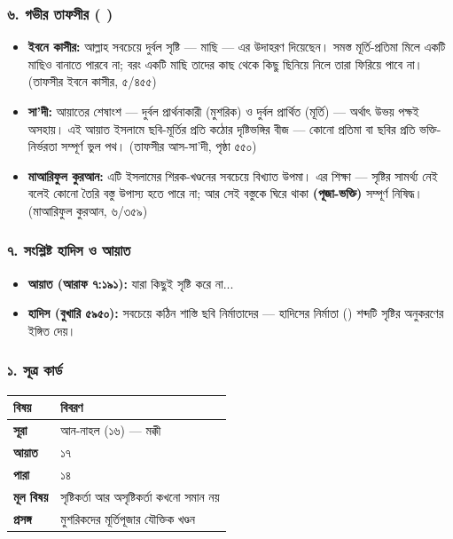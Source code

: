 \subsubsection*{৬. গভীর তাফসীর ( )}

\begin{itemize}
\item \textbf{ইবনে কাসীর:} আল্লাহ সবচেয়ে দুর্বল সৃষ্টি — মাছি — এর উদাহরণ দিয়েছেন। সমস্ত মূর্তি-প্রতিমা মিলে একটি মাছিও বানাতে পারবে না; বরং একটি মাছি তাদের কাছ থেকে কিছু ছিনিয়ে নিলে তারা ফিরিয়ে পাবে না। (তাফসীর ইবনে কাসীর, ৫/৪৫৫)
\item \textbf{সা'দী:} আয়াতের শেষাংশ — দুর্বল প্রার্থনাকারী (মুশরিক) ও দুর্বল প্রার্থিত (মূর্তি) — অর্থাৎ উভয় পক্ষই অসহায়। এই আয়াত ইসলামে ছবি-মূর্তির প্রতি কঠোর দৃষ্টিভঙ্গির বীজ — কোনো প্রতিমা বা ছবির প্রতি ভক্তি-নির্ভরতা সম্পূর্ণ ভুল পথ। (তাফসীর আস-সা'দী, পৃষ্ঠা ৫৫০)
\item \textbf{মাআরিফুল কুরআন:} এটি ইসলামের শিরক-খণ্ডনের সবচেয়ে বিখ্যাত উপমা। এর শিক্ষা — সৃষ্টির সামর্থ্য নেই বলেই কোনো তৈরি বস্তু উপাস্য হতে পারে না; আর সেই বস্তুকে ঘিরে থাকা \textbf{ (পূজা-ভক্তি)} সম্পূর্ণ নিষিদ্ধ। (মাআরিফুল কুরআন, ৬/৩৫৯)
\end{itemize}
\subsubsection*{৭. সংশ্লিষ্ট হাদিস ও আয়াত}

\begin{itemize}
\item \textbf{আয়াত (আরাফ ৭:১৯১):} যারা কিছুই সৃষ্টি করে না...
\item \textbf{হাদিস (বুখারি ৫৯৫০):} সবচেয়ে কঠিন শাস্তি ছবি নির্মাতাদের — হাদিসের নির্মাতা () শব্দটি সৃষ্টির অনুকরণের ইঙ্গিত দেয়।
\end{itemize}
\subsubsection*{১. সূত্র কার্ড}

\begin{table}[h]\centering\small
\begin{tabular}{ll}
বিষয় & বিবরণ \\
\hline
\textbf{সূরা} & আন-নাহল (১৬) — মক্কী \\
\textbf{আয়াত} & ১৭ \\
\textbf{পারা} & ১৪ \\
\textbf{মূল বিষয়} & সৃষ্টিকর্তা আর অসৃষ্টিকর্তা কখনো সমান নয় \\
\textbf{প্রসঙ্গ} & মুশরিকদের মূর্তিপূজার যৌক্তিক খণ্ডন \\
\hline
\end{tabular}
\end{table}

